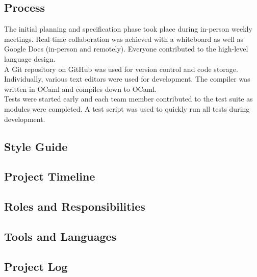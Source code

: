 \subsection{Process}
The initial planning and specification phase took place during in-person weekly meetings. Real-time collaboration was achieved with a whiteboard as well as Google Docs (in-person and remotely). Everyone contributed to the high-level language design.\\
A Git repository on GitHub was used for version control and code storage. Individually, various text editors were used for development. The compiler was written in OCaml and compiles down to OCaml.\\
Tests were started early and each team member contributed to the test suite as modules were completed. A test script was used to quickly run all tests during development.

\subsection{Style Guide}

\subsection{Project Timeline}

\subsection{Roles and Responsibilities}

\subsection{Tools and Languages}

\subsection{Project Log}

